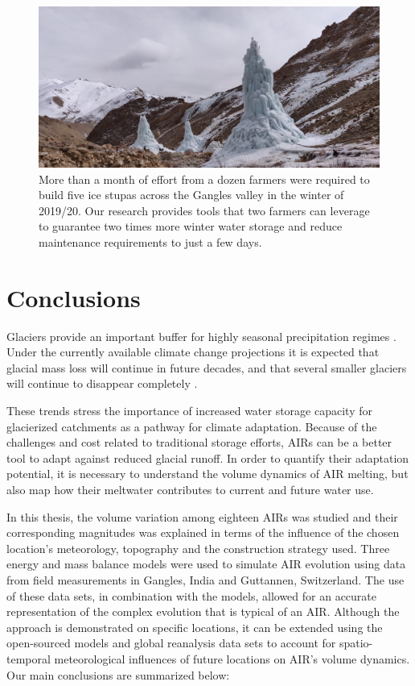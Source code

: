 \begin{figure}[htb]
	\includegraphics[width=\textwidth]{figs/icestupa_valley}

  \caption{More than a month of effort from a dozen farmers were required to build five ice stupas across the
  Gangles valley in the winter of 2019/20. Our research provides tools that two farmers can leverage to
  guarantee two times more winter water storage and reduce maintenance requirements to just a few days.}

	\label{fig:icestupa_valley}
\end{figure}

\section{Conclusions}

Glaciers provide an important buffer for highly seasonal precipitation regimes
\citep{kaserContributionPotentialGlaciers2010}. Under the currently available climate change projections it is
expected that glacial mass loss will continue in future decades, and that several smaller glaciers will continue
to disappear completely \citep{rabatelCurrentStateGlaciers2013}.

These trends stress the importance of increased water storage capacity for glacierized catchments as a pathway
for climate adaptation. Because of the challenges and cost related to traditional storage efforts, \ac{AIRs} can
be a better tool to adapt against reduced glacial runoff. In order to quantify their adaptation potential, it is
necessary to understand the volume dynamics of AIR melting, but also map how their meltwater contributes to
current and future water use. 

In this thesis, the volume variation among eighteen AIRs was studied and their corresponding magnitudes was
explained in terms of the influence of the chosen location's meteorology, topography and the construction
strategy used. Three energy and mass balance models were used to simulate AIR evolution using data from field
measurements in Gangles, India and Guttannen, Switzerland. The use of these data sets, in combination with the
models, allowed for an accurate representation of the complex evolution that is typical of an AIR.  Although the
approach is demonstrated on specific locations, it can be extended using the open-sourced models and global
reanalysis data sets to account for spatio-temporal meteorological influences of future locations on AIR's
volume dynamics. Our main conclusions are summarized below:


